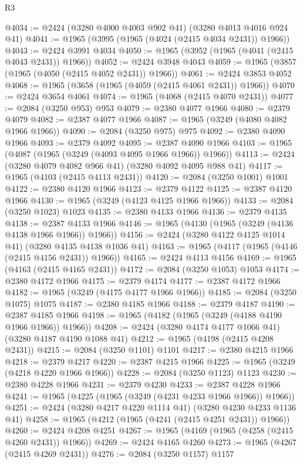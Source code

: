 \begin{lexlean}{R3}
\begin{coremodule}
@4034 := @2424 (@3280 @4000 @4003 @902 @41) (@3280 @4013 @4016 @924 @41)
@4041 := @1965 (@3995 (@1965 (@4024 (@2415 @4034 @2431)) @1966))
@4043 := @2424 @3991 @4034
@4050 := @1965 (@3952 (@1965 (@4041 (@2415 @4043 @2431)) @1966))
@4052 := @2424 @3948 @4043
@4059 := @1965 (@3857 (@1965 (@4050 (@2415 @4052 @2431)) @1966))
@4061 := @2424 @3853 @4052
@4068 := @1965 (@3658 (@1965 (@4059 (@2415 @4061 @2431)) @1966))
@4070 := @2424 @3654 @4061
@4074 := @1965 (@4068 (@2415 @4070 @2431))
@4077 := @2084 (@3250 @953) @953
@4079 := @2380 @4077 @1966
@4080 := @2379 @4079
@4082 := @2387 @4077 @1966
@4087 := @1965 (@3249 (@4080 @4082 @1966 @1966))
@4090 := @2084 (@3250 @975) @975
@4092 := @2380 @4090 @1966
@4093 := @2379 @4092
@4095 := @2387 @4090 @1966
@4103 := @1965 (@4087 (@1965 (@3249 (@4093 @4095 @1966 @1966)) @1966))
@4113 := @2424 (@3280 @4079 @4082 @966 @41) (@3280 @4092 @4095 @988 @41)
@4117 := @1965 (@4103 (@2415 @4113 @2431))
@4120 := @2084 (@3250 @1001) @1001
@4122 := @2380 @4120 @1966
@4123 := @2379 @4122
@4125 := @2387 @4120 @1966
@4130 := @1965 (@3249 (@4123 @4125 @1966 @1966))
@4133 := @2084 (@3250 @1023) @1023
@4135 := @2380 @4133 @1966
@4136 := @2379 @4135
@4138 := @2387 @4133 @1966
@4146 := @1965 (@4130 (@1965 (@3249 (@4136 @4138 @1966 @1966)) @1966))
@4156 := @2424 (@3280 @4122 @4125 @1014 @41) (@3280 @4135 @4138 @1036 @41)
@4163 := @1965 (@4117 (@1965 (@4146 (@2415 @4156 @2431)) @1966))
@4165 := @2424 @4113 @4156
@4169 := @1965 (@4163 (@2415 @4165 @2431))
@4172 := @2084 (@3250 @1053) @1053
@4174 := @2380 @4172 @1966
@4175 := @2379 @4174
@4177 := @2387 @4172 @1966
@4182 := @1965 (@3249 (@4175 @4177 @1966 @1966))
@4185 := @2084 (@3250 @1075) @1075
@4187 := @2380 @4185 @1966
@4188 := @2379 @4187
@4190 := @2387 @4185 @1966
@4198 := @1965 (@4182 (@1965 (@3249 (@4188 @4190 @1966 @1966)) @1966))
@4208 := @2424 (@3280 @4174 @4177 @1066 @41) (@3280 @4187 @4190 @1088 @41)
@4212 := @1965 (@4198 (@2415 @4208 @2431))
@4215 := @2084 (@3250 @1101) @1101
@4217 := @2380 @4215 @1966
@4218 := @2379 @4217
@4220 := @2387 @4215 @1966
@4225 := @1965 (@3249 (@4218 @4220 @1966 @1966))
@4228 := @2084 (@3250 @1123) @1123
@4230 := @2380 @4228 @1966
@4231 := @2379 @4230
@4233 := @2387 @4228 @1966
@4241 := @1965 (@4225 (@1965 (@3249 (@4231 @4233 @1966 @1966)) @1966))
@4251 := @2424 (@3280 @4217 @4220 @1114 @41) (@3280 @4230 @4233 @1136 @41)
@4258 := @1965 (@4212 (@1965 (@4241 (@2415 @4251 @2431)) @1966))
@4260 := @2424 @4208 @4251
@4267 := @1965 (@4169 (@1965 (@4258 (@2415 @4260 @2431)) @1966))
@4269 := @2424 @4165 @4260
@4273 := @1965 (@4267 (@2415 @4269 @2431))
@4276 := @2084 (@3250 @1157) @1157

\end{coremodule}
\end{lexlean}
